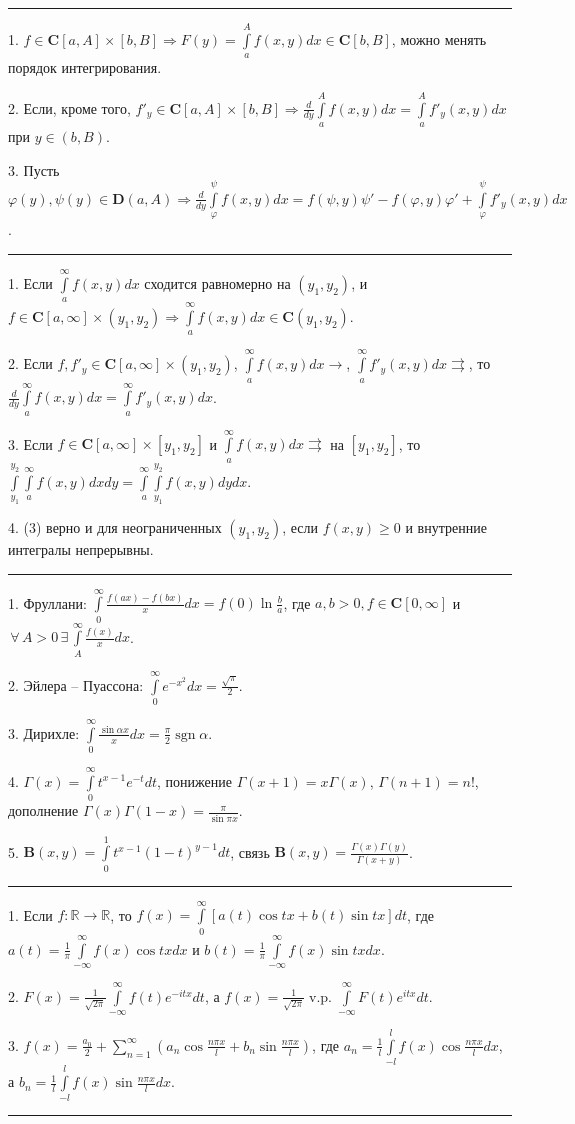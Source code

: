 \documentclass{article}
\newcommand{\intl}[2]{\int\limits_{{#1}}^{{#2}}}
\newcommand{\suml}[2]{\sum\limits_{{#1}}^{{#2}}}
\newcommand{\contdi}[4]{\in \textbf{C}[#1,#2]\times(#3,#4)}
\newcommand{\contd}[4]{\in \textbf{C}[#1,#2]\times[#3,#4]}
\newcommand{\cont}[2]{\in \textbf{C}[#1,#2]}
\newcommand{\conti}[2]{\in \textbf{C}(#1,#2)}
\newcommand{\diff}[2]{\in \textbf{D}(#1,#2)}
\newcommand{\then}{\Rightarrow}
\newcommand{\sel}[1]{\par\textbf{\textit{#1}}\par}
\newcommand{\ph}{\varphi}
\newcommand{\ps}{\psi}
\newcommand{\dra}{\rightrightarrows}
\renewcommand{\ge}{\geqslant}
\newcommand{\fa}{\,\forall\,}
\newcommand{\exi}{\,\exists\,}
\newcommand{\R}{\mathbb{R}}
\newcommand{\npxl}{\frac{n\pi x}{l}}
\DeclareMathOperator{\sgn}{sgn}
\DeclareMathOperator{\vp}{v.p.}
\newcommand{\bh}[1]{\left(#1\right)}
\newcommand{\delim}{\vskip 1pt \hrule \vskip 1pt}
\begin{document}
\scriptsize
\setlength{\baselineskip}{0pt}

\delim
1. $f \contd{a}{A}{b}{B} \then F(y)=\intl{a}{A}f(x,y)dx \cont{b}{B}$, можно менять порядок интегрирования.

2. Если, кроме того, $f'_y \contd{a}{A}{b}{B} \then \frac{d}{dy}\intl{a}{A}f(x,y)dx=\intl{a}{A}f'_y(x,y)dx$ при  $y \in (b,B)$.

3. Пусть $\ph(y), \ps(y) \diff{a}{A} \then \frac{d}{dy}\intl{\ph}{\ps}f(x,y)dx=f(\ps,y)\ps'-f(\ph,y)\ph'+\intl{\ph}{\ps}f'_y(x,y)dx$.
\delim
1. Если $\intl{a}{\infty}f(x,y)dx$ сходится равномерно на $(y_1,y_2)$, и $f \contdi{a}{\infty}{y_1}{y_2} \then \intl{a}{\infty}f(x,y)dx \conti{y_1}{y_2}$.

2. Если $f,f'_y \contdi{a}{\infty}{y_1}{y_2}$, $\intl{a}{\infty}f(x,y)dx \to$, $\intl{a}{\infty}f'_y(x,y)dx \dra$, то
$\frac{d}{dy}\intl{a}{\infty}f(x,y)dx=\intl{a}{\infty}f'_y(x,y)dx$.

3. Если $f \contd{a}{\infty}{y_1}{y_2}$ и $\intl{a}{\infty}f(x,y)dx \dra$ на $[y_1,y_2]$, то $\intl{y_1}{y_2}\intl{a}{\infty}f(x,y)dxdy=
\intl{a}{\infty}\intl{y_1}{y_2}f(x,y)dydx$.

4. (3) верно и для неограниченных $(y_1,y_2)$, если $f(x,y) \ge 0$ и внутренние интегралы непрерывны.
\delim
1. Фруллани: $\intl{0}{\infty}\frac{f(ax)-f(bx)}{x}dx=f(0)\ln\frac{b}{a}$, где $a,b>0, f \cont{0}{\infty}$ и $\fa A>0 \exi
\intl{A}{\infty}\frac{f(x)}{x}dx$.

2. Эйлера -- Пуассона: $\intl{0}{\infty}e^{-x^2}dx=\frac{\sqrt{\pi}}{2}$.

3. Дирихле: $\intl{0}{\infty}\frac{\sin\alpha x}{x}dx=\frac{\pi}{2}\sgn \alpha$.

4. $\Gamma(x)=\intl{0}{\infty}t^{x-1}e^{-t}dt$, понижение $\Gamma(x+1)=x\Gamma(x)$, $\Gamma(n+1)=n!$, дополнение $\Gamma(x)\Gamma(1-x)=\frac{\pi}{\sin \pi x}$.

5. $\textbf{B}(x,y)=\intl{0}{1}t^{x-1}(1-t)^{y-1}dt$, связь $\textbf{B}(x,y)=\frac{\Gamma(x)\Gamma(y)}{\Gamma(x+y)}$.
\delim
1. Если $f:\R \to \R$, то $f(x)=\intl{0}{\infty}[a(t)\cos tx+b(t)\sin tx]dt$, где $a(t)=\frac{1}{\pi}\intl{-\infty}{\infty}f(x)\cos tx dx$ и
$b(t)=\frac{1}{\pi}\intl{-\infty}{\infty}f(x)\sin tx dx$.

2. $F(x)=\frac{1}{\sqrt{2\pi}}\intl{-\infty}{\infty}f(t)e^{-itx}dt$, а $f(x)=\frac{1}{\sqrt{2\pi}}\vp\intl{-\infty}{\infty}F(t)e^{itx}dt$.

3. $f(x)=\frac{a_0}{2}+\suml{n=1}{\infty}\bh{a_n\cos\npxl+b_n\sin\npxl}$, где $a_n=\frac{1}{l}\intl{-l}{l}f(x)\cos\npxl dx$,
а $b_n=\frac{1}{l}\intl{-l}{l}f(x)\sin\npxl dx$.
\delim
\end{document}
